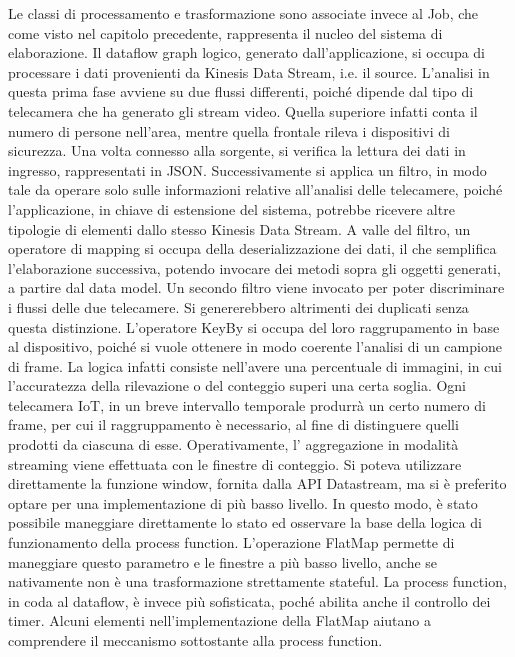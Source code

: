 Le classi di processamento e trasformazione sono associate invece al Job, che come visto nel capitolo precedente, rappresenta il nucleo del sistema di elaborazione. Il dataflow graph logico, generato dall'applicazione, si occupa di processare i dati provenienti da Kinesis Data Stream, i.e. il source. L'analisi in questa prima fase avviene su due flussi differenti, poiché  dipende dal tipo di telecamera che ha generato gli stream video. Quella superiore infatti conta il numero di persone nell'area, mentre quella frontale rileva i dispositivi di sicurezza. Una volta connesso alla sorgente, si verifica la lettura dei dati in ingresso, rappresentati in JSON. Successivamente si applica un filtro, in modo tale da operare solo sulle informazioni relative all'analisi delle telecamere, poiché l'applicazione, in chiave di estensione del sistema, potrebbe ricevere altre tipologie di elementi dallo stesso Kinesis Data Stream. A valle del filtro, un operatore di mapping si occupa della deserializzazione dei dati, il che semplifica l'elaborazione successiva, potendo invocare dei metodi sopra gli oggetti generati, a partire dal data model. Un secondo filtro viene invocato per poter discriminare i flussi delle due telecamere. Si genererebbero altrimenti dei duplicati senza questa distinzione. L'operatore KeyBy si occupa del loro raggrupamento in base al dispositivo, poiché si vuole ottenere in modo coerente l'analisi di un campione di frame. La logica infatti consiste nell'avere una percentuale di immagini, in cui l'accuratezza della rilevazione o del conteggio superi una certa soglia. Ogni telecamera IoT, in un breve intervallo temporale produrrà un certo numero di frame, per cui il raggruppamento è necessario, al fine di distinguere quelli prodotti da ciascuna di esse. Operativamente, l' aggregazione in modalità streaming viene effettuata con le finestre di conteggio. Si poteva utilizzare direttamente la funzione window, fornita dalla API Datastream, ma si è preferito optare per una implementazione di più basso livello. In questo modo, è stato possibile maneggiare direttamente lo stato ed osservare la base della logica di funzionamento della process function. L'operazione FlatMap permette di maneggiare questo parametro e le finestre a più basso livello, anche se nativamente non è una trasformazione strettamente stateful. La process function,  in coda al dataflow, è invece più sofisticata, poché abilita anche il controllo dei timer. Alcuni elementi nell'implementazione della FlatMap aiutano a comprendere il meccanismo sottostante alla process function.

